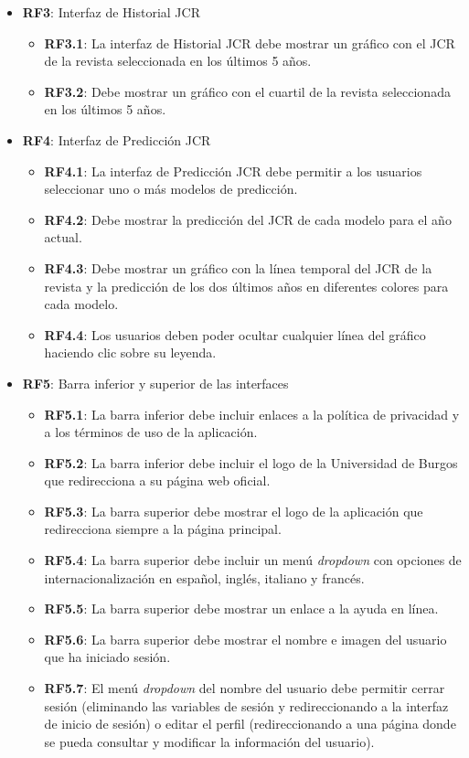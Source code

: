 \begin{itemize}
  \newpage
  \item \textbf{RF3}: Interfaz de Historial JCR
  \begin{itemize}
    \item \textbf{RF3.1}: La interfaz de Historial JCR debe mostrar un gráfico con el JCR de la revista seleccionada en los últimos 5 años.
    \item \textbf{RF3.2}: Debe mostrar un gráfico con el cuartil de la revista seleccionada en los últimos 5 años.
  \end{itemize}
  
  \item \textbf{RF4}: Interfaz de Predicción JCR
  \begin{itemize}
    \item \textbf{RF4.1}: La interfaz de Predicción JCR debe permitir a los usuarios seleccionar uno o más modelos de predicción.
    \item \textbf{RF4.2}: Debe mostrar la predicción del JCR de cada modelo para el año actual.
    \item \textbf{RF4.3}: Debe mostrar un gráfico con la línea temporal del JCR de la revista y la predicción de los dos últimos años en diferentes colores para cada modelo.
    \item \textbf{RF4.4}: Los usuarios deben poder ocultar cualquier línea del gráfico haciendo clic sobre su leyenda.
  \end{itemize}
  
  \item \textbf{RF5}: Barra inferior y superior de las interfaces
  \begin{itemize}
    \item \textbf{RF5.1}: La barra inferior debe incluir enlaces a la política de privacidad y a los términos de uso de la aplicación.
    \item \textbf{RF5.2}: La barra inferior debe incluir el logo de la Universidad de Burgos que redirecciona a su página web oficial.
    \item \textbf{RF5.3}: La barra superior debe mostrar el logo de la aplicación que redirecciona siempre a la página principal.
    \item \textbf{RF5.4}: La barra superior debe incluir un menú \textit{dropdown} con opciones de internacionalización en español, inglés, italiano y francés.
    \item \textbf{RF5.5}: La barra superior debe mostrar un enlace a la ayuda en línea.
    \item \textbf{RF5.6}: La barra superior debe mostrar el nombre e imagen del usuario que ha iniciado sesión.
    \item \textbf{RF5.7}: El menú \textit{dropdown} del nombre del usuario debe permitir cerrar sesión (eliminando las variables de sesión y redireccionando a la interfaz de inicio de sesión) o editar el perfil (redireccionando a una página donde se pueda consultar y modificar la información del usuario).
  \end{itemize}
  

\end{itemize}
